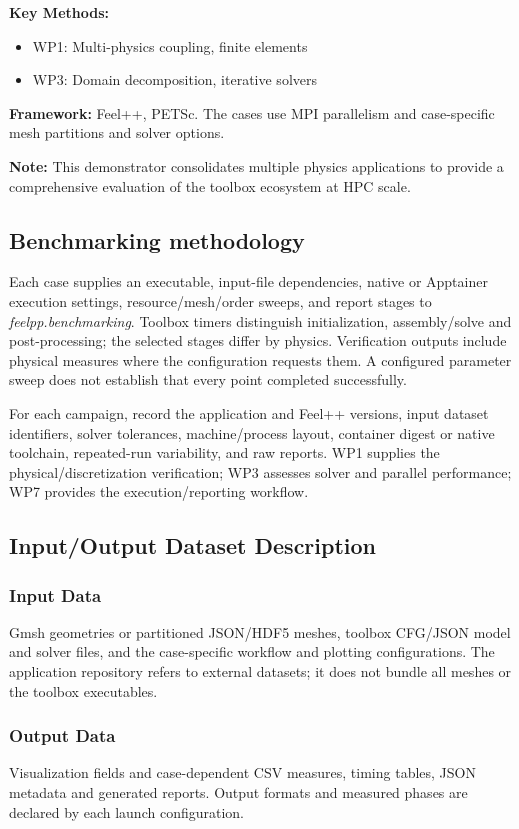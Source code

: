 \textbf{Key Methods:}
\begin{itemize}
\item WP1: Multi-physics coupling, finite elements
\item WP3: Domain decomposition, iterative solvers
\end{itemize}

\textbf{Framework:} Feel++, PETSc. The cases use MPI parallelism and
case-specific mesh partitions and solver options.

\textbf{Note:} This demonstrator consolidates multiple physics applications to provide a comprehensive evaluation of the \Feelpp toolbox ecosystem at HPC scale.

\subsection{Benchmarking methodology}
Each case supplies an executable, input-file dependencies, native or Apptainer
execution settings, resource/mesh/order sweeps, and report stages to
\textit{feelpp.benchmarking}. Toolbox timers distinguish initialization,
assembly/solve and post-processing; the selected stages differ by physics.
Verification outputs include physical measures where the configuration
requests them. A configured parameter sweep does not establish that every point
completed successfully.

For each campaign, record the application and Feel++ versions, input
dataset identifiers, solver tolerances, machine/process layout, container
digest or native toolchain, repeated-run variability, and raw reports.
WP1 supplies the physical/discretization verification; WP3 assesses solver
and parallel performance; WP7 provides the execution/reporting workflow.

\subsection{Input/Output Dataset Description}

\subsubsection{Input Data}
Gmsh geometries or partitioned JSON/HDF5 meshes, toolbox CFG/JSON model and
solver files, and the case-specific workflow and plotting configurations.
The application repository refers to external datasets; it does not bundle
all meshes or the toolbox executables.

\subsubsection{Output Data}
Visualization fields and case-dependent CSV measures, timing tables,
JSON metadata and generated reports. Output formats and measured phases are
declared by each launch configuration.

